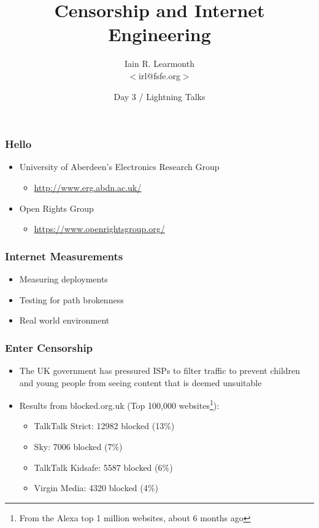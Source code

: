 \documentclass{beamer}
\title{Censorship and Internet Engineering}
\author[Iain R. Learmonth]{Iain R. Learmonth \\ $<$irl@fsfe.org$>$}
\institute[UoA / ORG]{University of Aberdeen / Open Rights Group}
\date[Day 3]{Day 3 / Lightning Talks}
\begin{document}
\begin{frame}
\maketitle
\end{frame}

\begin{frame}
	\frametitle{Hello}
	\begin{itemize}
		\item{University of Aberdeen's Electronics Research Group}
			\begin{itemize}
				\item{\url{http://www.erg.abdn.ac.uk/}}
			\end{itemize}
		\item{Open Rights Group}
			\begin{itemize}
				\item{\url{https://www.openrightsgroup.org/}}
			\end{itemize}
	\end{itemize}
\end{frame}

\begin{frame}
	\frametitle{Internet Measurements}
	\begin{itemize}
		\item{Measuring deployments}
		\item{Testing for path brokenness}
		\item{Real world environment}
	\end{itemize}
\end{frame}

\begin{frame}
	\frametitle{Enter Censorship}
	\begin{itemize}
		\item{The UK government has pressured ISPs to filter traffic to prevent children and young people from seeing content that is deemed unsuitable}
		\item{Results from blocked.org.uk (Top 100,000 websites\footnote{From the Alexa top 1 million websites, about 6 months ago}):}
		\begin{itemize}
			\item{TalkTalk Strict: 12982 blocked (13\%)}
			\item{Sky: 7006 blocked (7\%)}
			\item{TalkTalk Kidsafe: 5587 blocked (6\%)}
			\item{Virgin Media: 4320 blocked (4\%)}
		\end{itemize}
	\end{itemize}
\end{frame}
\end{document}
